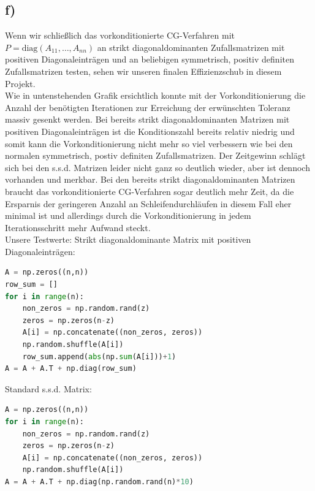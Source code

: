 \subsection*{f)}
Wenn wir schließlich das vorkonditionierte CG-Verfahren mit $P = \text{diag}(A_{11},\dots,A_{nn})$ an strikt diagonaldominanten
Zufallsmatrizen mit positiven Diagonaleinträgen und an beliebigen symmetrisch, positiv definiten Zufallsmatrizen testen, sehen
wir unseren finalen Effizienzschub in diesem Projekt. \\
Wie in untenstehenden Grafik ersichtlich konnte mit der Vorkonditionierung die Anzahl der benötigten Iterationen
zur Erreichung der erwünschten Toleranz massiv gesenkt werden. Bei bereits strikt diagonaldominanten Matrizen mit positiven
Diagonaleinträgen ist die Konditionszahl
bereits relativ niedrig und somit kann die Vorkonditionierung nicht mehr so viel verbessern wie bei den normalen symmetrisch,
postiv definiten Zufallsmatrizen. Der Zeitgewinn schlägt sich bei den s.s.d. Matrizen leider nicht ganz so deutlich wieder,
aber ist dennoch vorhanden und merkbar. Bei den bereits strikt diagonaldominanten Matrizen braucht das vorkonditionierte CG-Verfahren
sogar deutlich mehr Zeit, da die Ersparnis der geringeren Anzahl an Schleifendurchläufen in diesem Fall eher minimal ist und
allerdings durch die Vorkonditionierung in jedem Iterationsschritt mehr Aufwand steckt. \\
Unsere Testwerte: Strikt diagonaldominante Matrix mit positiven Diagonaleinträgen: \\
\begin{lstlisting}[language=Python]
A = np.zeros((n,n))
row_sum = []
for i in range(n):
    non_zeros = np.random.rand(z)
    zeros = np.zeros(n-z)
    A[i] = np.concatenate((non_zeros, zeros))
    np.random.shuffle(A[i])
    row_sum.append(abs(np.sum(A[i]))+1)
A = A + A.T + np.diag(row_sum)
\end{lstlisting}
Standard s.s.d. Matrix:
\begin{lstlisting}[language=Python]
A = np.zeros((n,n))
for i in range(n):
    non_zeros = np.random.rand(z)
    zeros = np.zeros(n-z)
    A[i] = np.concatenate((non_zeros, zeros))
    np.random.shuffle(A[i])
A = A + A.T + np.diag(np.random.rand(n)*10)
\end{lstlisting}
\FloatBarrier
